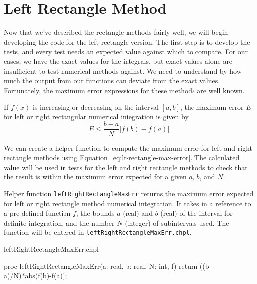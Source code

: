 \section{Left Rectangle Method}
\begin{seamlessnote}
  Now that we've described the rectangle methods fairly well, we will begin developing the code 
  for the left rectangle version.  The first step is to develop the tests, and
  every test needs an expected value against which to compare. For our cases, we have the exact
  values for the integrals, but exact values alone are insufficient to test numerical methods
  against. We need to understand by how much the output from our functions can deviate from
  the exact values. Fortunately, the maximum error expressions for these methods are well
  known.
\end{seamlessnote}

If $f(x)$ is increasing or decreasing on the interval $[a,b]$, the maximum error $E$ 
for left or right rectangular numerical integration is given by
\begin{equation}
E \leq \frac{b-a}{N}\left|f(b)-f(a)\right| \label{eq:lr-rectangle-max-error}
\end{equation}

We can create a helper function to compute the maximum error for left and right rectangle
methods using Equation~\ref{eq:lr-rectangle-max-error}. The calculated value will be used
in tests for the left and right rectangle methods to check that the result is within 
the maximum error expected for a given $a$, $b$, and $N$. 
\begin{enumspec}
\item{} Helper function \lstinline{leftRightRectangleMaxErr} returns the
maximum error expected for left or right rectangle method numerical integration. It 
takes in a reference to a pre-defined function $f$, the bounds $a$ (real) and $b$ (real) of the 
interval for definite integration, and the number $N$ (integer) of subintervals used.
The function will be entered in \lstinline{leftRightRectangleMaxErr.chpl}.
\end{enumspec}

\begin{chapelhelper}{leftRightRectangleMaxErr.chpl}
\begin{chapel}
proc leftRightRectangleMaxErr(a: real, b: real, N: int, f){
  return ((b-a)/N)*abs(f(b)-f(a));
}
\end{chapel}
\end{chapelhelper}

